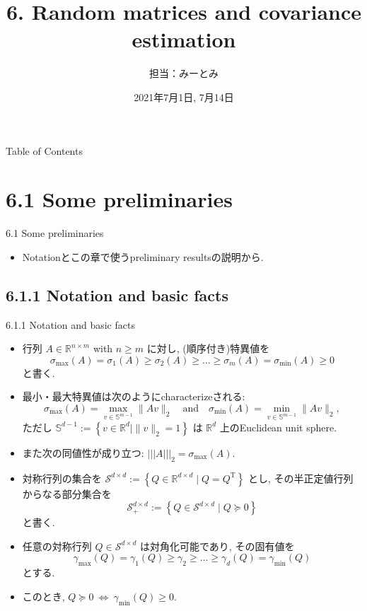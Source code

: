 \documentclass[unicode,aspectratio=169,11pt]{beamer}
\title{6. Random matrices and covariance estimation}
\author{担当：みーとみ}
\date{2021年7月1日, 7月14日}
\newcommand{\bb}{\mathbb}
\newcommand{\cc}{\mathcal}
\newcommand{\tr}{\mathrm{T}}
\begin{document}
\maketitle

\begin{frame}{Table of Contents}{}
    \setcounter{tocdepth}{1}
    \tableofcontents
\end{frame}

\section{6.1 Some preliminaries}
\begin{frame}{6.1 Some preliminaries}
  \begin{itemize}
    \item Notationとこの章で使うpreliminary resultsの説明から.
  \end{itemize}
\end{frame}

\subsection{6.1.1 Notation and basic facts}
\begin{frame}{6.1.1 Notation and basic facts}{}
  \begin{itemize}
    \item 行列 $A \in \bb{R}^{n \times m}$ with $n \ge m$ に対し, (順序付き)特異値を
    \[ \sigma_{\max}(A) = \sigma_1(A) \ge \sigma_2(A) \ge \dots \ge \sigma_m(A) = \sigma_{\min}(A) \ge 0 \]
    と書く.
    \item 最小・最大特異値は次のようにcharacterizeされる:
    \[ \sigma_{\max}(A) = \max_{v \in \bb{S}^{m-1}}\| Av \|_2 \quad \mathrm{and} \quad \sigma_{\min}(A) = \min_{v \in \bb{S}^{m-1}}\|Av\|_2, \tag{6.1} \]
    ただし $\bb{S}^{d-1} := \left\{ v \in \bb{R}^d \mid \|v\|_2 = 1 \right\}$ は $\bb{R}^d$ 上のEuclidean unit sphere.
    \item また次の同値性が成り立つ: $||| A |||_2 = \sigma_{\max}(A)$.
  \end{itemize}
\end{frame}

\begin{frame}
  \begin{itemize}
    \item 対称行列の集合を ${\cc{S}}^{d\times d} := \left\{Q\in\bb{R}^{d\times d} \mid Q = Q^\tr\right\}$ とし, その半正定値行列からなる部分集合を
    \[ \cc{S}_+^{d \times d} := \left\{Q \in \cc{S}^{d \times d} \mid Q \succeq 0\right\} \tag{6.2} \]
    と書く.
    \item 任意の対称行列 $Q \in \cc{S}^{d\times d}$ は対角化可能であり, その固有値を
    \[ \gamma_{\max}(Q) = \gamma_1(Q) \ge \gamma_2 \ge \dots \ge \gamma_d(Q) = \gamma_{\min}(Q) \]
    とする.
    \item このとき, $Q \succeq 0 \ \Leftrightarrow \ \gamma_{\min}(Q) \ge 0$.
  \end{itemize}
\end{frame}
\end{document}

